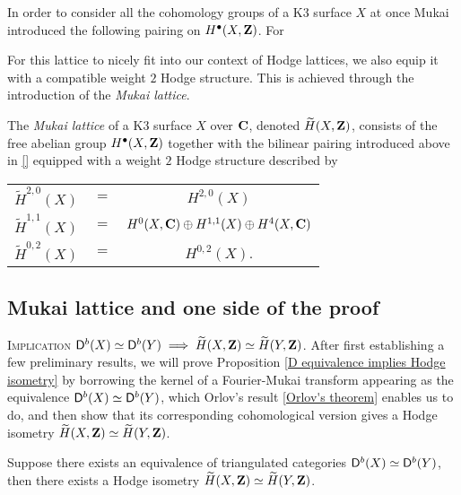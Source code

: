 In order to consider all the cohomology groups of a K3 surface $X$ at once Mukai introduced the following pairing on $H^{\bullet}(X, \mathbf Z)$. For 

For this lattice to nicely fit into our context of Hodge lattices, we also equip it with a compatible weight $2$ Hodge structure. This is achieved through the introduction of the \emph{Mukai lattice}. 

\begin{definition}
    The \emph{Mukai lattice} of a K3 surface $X$ over $\mathbf C$, denoted $\widetilde{H}(X, \mathbf Z)$, consists of the free abelian group $H^{\bullet}(X, \mathbf Z)$ together with the bilinear pairing introduced above in \eqref{} equipped with a weight $2$ Hodge structure described by 
\end{definition}

\begin{center}
    \begin{tabular}{r c c}
        $\widetilde{H}^{2,0}(X)$ & $=$ & $H^{2,0}(X)$ \\
        $\widetilde{H}^{1,1}(X)$ & $=$ & $H^{0}(X, \mathbf C) \oplus H^{1,1}(X) \oplus H^{4}(X, \mathbf C)$ \\
        $\widetilde{H}^{0,2}(X)$ & $=$ & $H^{0,2}(X)$.
    \end{tabular}
\end{center}

\subsection{Mukai lattice and one side of the proof}


\noindent
\textsc{Implication $\mathsf{D}^b(X) \simeq \mathsf{D}^b(Y) \implies \widetilde{H}(X, \mathbf Z) \simeq \widetilde{H}(Y, \mathbf Z)$.} After first establishing a few preliminary results, we will prove Proposition \ref{D equivalence implies Hodge isometry} by borrowing the kernel of a Fourier-Mukai transform appearing as the equivalence $\mathsf{D}^b(X) \simeq \mathsf{D}^b(Y)$, which Orlov's result \ref{Orlov's theorem} enables us to do, and then show that its corresponding cohomological version gives a Hodge isometry $\widetilde{H}(X, \mathbf Z) \simeq \widetilde{H}(Y, \mathbf Z)$.

\begin{proposition}
    \label{D equivalence implies Hodge isometry}
    Suppose there exists an equivalence of triangulated categories $\mathsf{D}^b(X) \simeq \mathsf{D}^b(Y)$, then there exists a Hodge isometry $\widetilde{H}(X, \mathbf Z) \simeq \widetilde{H}(Y, \mathbf Z)$.
\end{proposition}


